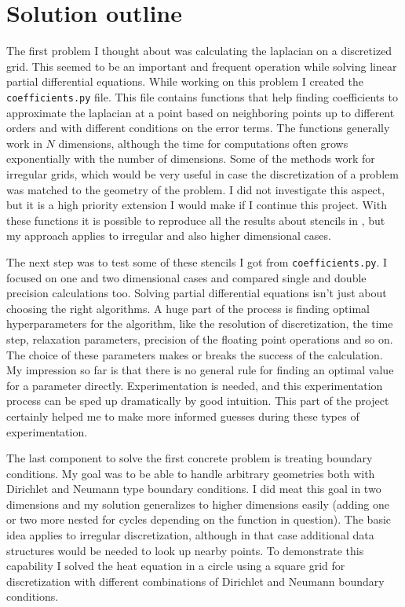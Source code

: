 \documentclass[pdftex,12pt,a4paper]{article}
\newcommand{\ctexttt}[1]{\colorbox{cverbbg}{\texttt{#1}}}
\begin{document}
	\section{Solution outline}
		The first problem I thought about was calculating the laplacian on a discretized grid. This seemed to be an important and frequent operation while solving linear partial differential equations. While working on this problem I created the \ctexttt{coefficients.py} file. This file contains functions that help finding coefficients to approximate the laplacian at a point based on neighboring points up to different orders and with different conditions on the error terms. The functions generally work in $N$ dimensions, although the time for computations often grows exponentially with the number of dimensions. Some of the methods work for irregular grids, which would be very useful in case the discretization of a problem was matched to the geometry of the problem. I did not investigate this aspect, but it is a high priority extension I would make if I continue this project. With these functions it is possible to reproduce all the results about stencils in \cite{patra}, but my approach applies to irregular and also higher dimensional cases.
		
		The next step was to test some of these stencils I got from \ctexttt{coefficients.py}. I focused on one and two dimensional cases and compared single and double precision calculations too. Solving partial differential equations isn't just about choosing the right algorithms. A huge part of the process is finding optimal hyperparameters for the algorithm, like the resolution of discretization, the time step, relaxation parameters, precision of the floating point operations and so on. The choice of these parameters makes or breaks the success of the calculation. My impression so far is that there is no general rule for finding an optimal value for a parameter directly. Experimentation is needed, and this experimentation process can be sped up dramatically by good intuition. This part of the project certainly helped me to make more informed guesses during these types of experimentation.
		
		The last component to solve the first concrete problem is treating boundary conditions. My goal was to be able to handle arbitrary geometries both with Dirichlet and Neumann type boundary conditions. I did meat this goal in two dimensions and my solution generalizes to higher dimensions easily (adding one or two more nested for cycles depending on the function in question). The basic idea applies to irregular discretization, although in that case additional data structures would be needed to look up nearby points. To demonstrate this capability I solved the heat equation in a circle using a square grid for discretization with different combinations of Dirichlet and Neumann boundary conditions. \cite{}
\end{document}
